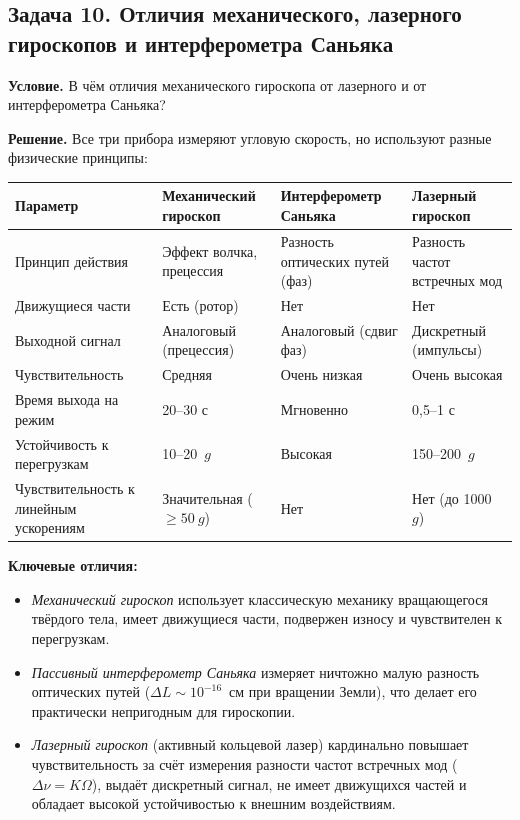 \documentclass[12pt, a4paper]{article}
\begin{document}
\subsection*{Задача 10. Отличия механического, лазерного гироскопов и интерферометра Саньяка}

\textbf{Условие.} В чём отличия механического гироскопа от лазерного и от интерферометра Саньяка?

\textbf{Решение.} Все три прибора измеряют угловую скорость, но используют разные физические принципы:

\begin{table}[h]
\centering
\begin{tabular}{|p{3.5cm}|p{4cm}|p{4cm}|p{4cm}|}
\hline
\textbf{Параметр} & \textbf{Механический гироскоп} & \textbf{Интерферометр Саньяка} & \textbf{Лазерный гироскоп} \\
\hline
Принцип действия & Эффект волчка, прецессия & Разность оптических путей (фаз) & Разность частот встречных мод \\
\hline
Движущиеся части & Есть (ротор) & Нет & Нет \\
\hline
Выходной сигнал & Аналоговый (прецессия) & Аналоговый (сдвиг фаз) & Дискретный (импульсы) \\
\hline
Чувствительность & Средняя & Очень низкая & Очень высокая \\
\hline
Время выхода на режим & 20--30 с & Мгновенно & 0{,}5--1 с \\
\hline
Устойчивость к перегрузкам & 10--20~$g$ & Высокая & 150--200~$g$ \\
\hline
Чувствительность к линейным ускорениям & Значительная ($\geqslant 50~g$) & Нет & Нет (до 1000~$g$) \\
\hline
\end{tabular}
\end{table}

\textbf{Ключевые отличия:}
\begin{itemize}[leftmargin=1.5em]
    \item \textit{Механический гироскоп} использует классическую механику вращающегося твёрдого тела, имеет движущиеся части, подвержен износу и чувствителен к перегрузкам.
    
    \item \textit{Пассивный интерферометр Саньяка} измеряет ничтожно малую разность оптических путей ($\Delta L \sim 10^{-16}$~см при вращении Земли), что делает его практически непригодным для гироскопии.
    
    \item \textit{Лазерный гироскоп} (активный кольцевой лазер) кардинально повышает чувствительность за счёт измерения разности частот встречных мод ($\Delta\nu = K\Omega$), выдаёт дискретный сигнал, не имеет движущихся частей и обладает высокой устойчивостью к внешним воздействиям.
\end{itemize}
\end{document}
